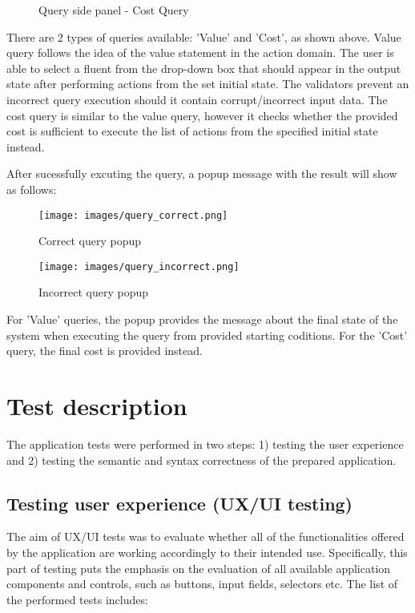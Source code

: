 \documentclass[a4paper]{article}
\begin{document}
\begin{itemize}
\begin{itemize}
\begin{figure}[H]
\begin{minipage}[b]{0.4\textwidth}
                    \caption{Query side panel - Cost Query}
                    \label{fig:cm-rho-001}
                \end{minipage}
            \end{figure}
            There are 2 types of queries available: 'Value' and 'Cost', as shown above. Value query follows the idea of the value statement in the action domain. The user is able to select a fluent from the drop-down box that should appear in the output state after performing actions from the set initial state. The validators prevent an incorrect query execution should it contain corrupt/incorrect input data. The cost query is similar to the value query, however it checks whether the provided cost is sufficient to execute the list of actions from the specified initial state instead.

            After sucessfully excuting the query, a popup message with the result will show as follows:
            \begin{figure}[H]
                \centering
                \begin{minipage}[b]{0.4\textwidth}
                    \texttt{[image: images/query\_correct.png]}
                    \caption{Correct query popup}
                    \label{fig:cm-rho-001}
                \end{minipage}
                \begin{minipage}[b]{0.4\textwidth}
                    \texttt{[image: images/query\_incorrect.png]}
                    \caption{Incorrect query popup}
                    \label{fig:cm-rho-001}
                \end{minipage}
            \end{figure}
            For 'Value' queries, the popup provides the message about the final state of the system when executing the query from provided starting coditions. For the 'Cost' query, the final cost is provided instead.
        \end{itemize}
\end{itemize}

\section{Test description}
%
The application tests were performed in two steps: 1) testing the user experience and 2) testing the semantic and syntax correctness of the prepared application.
\subsection{Testing user experience (UX/UI testing)}
%
The aim of UX/UI tests was to evaluate whether all of the functionalities offered by the application are working accordingly to their intended use. Specifically, this part of testing puts the emphasis on the evaluation of all available application components and controls, such as buttons, input fields, selectors etc. The list of the performed tests includes:
\end{document}

